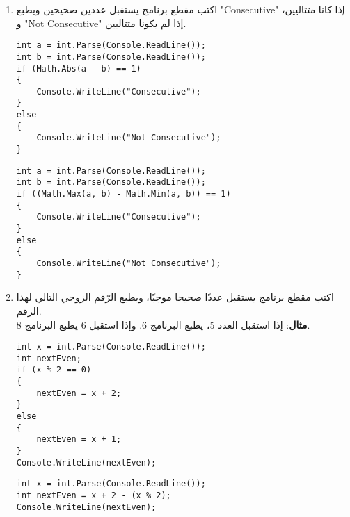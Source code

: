 \documentclass[14pt]{extarticle}
\begin{document}
\begin{enumerate}[itemsep=3em]

\item
اكتب مقطع برنامج يستقبل عددين صحيحين ويطبع \textenglish{"Consecutive"} إذا كانا متتاليين، و \textenglish{"Not Consecutive"} إذا لم يكونا متتاليين.

\ifwithsols
\begin{boxSolution}[1]
\begin{english}
\begin{verbatim}
int a = int.Parse(Console.ReadLine());
int b = int.Parse(Console.ReadLine());
if (Math.Abs(a - b) == 1)
{
    Console.WriteLine("Consecutive");
}
else
{
    Console.WriteLine("Not Consecutive");
}
\end{verbatim}
\end{english}
\end{boxSolution}
\begin{boxSolution}[2]
\begin{english}
\begin{verbatim}
int a = int.Parse(Console.ReadLine());
int b = int.Parse(Console.ReadLine());
if ((Math.Max(a, b) - Math.Min(a, b)) == 1)
{
    Console.WriteLine("Consecutive");
}
else
{
    Console.WriteLine("Not Consecutive");
}
\end{verbatim}
\end{english}
\end{boxSolution}
\clearpage
\fi

\item
اكتب مقطع برنامج يستقبل عددًا صحيحا موجبًا، ويطبع الرّقم الزوجي التالي لهذا الرقم.\\
\textbf{مثال}: إذا استقبل العدد 5، يطبع البرنامج 6. وإذا استقبل 6 يطبع البرنامج 8.

\ifwithsols
\begin{boxSolution}[1]
\begin{english}
\begin{verbatim}
int x = int.Parse(Console.ReadLine());
int nextEven;
if (x % 2 == 0)
{
    nextEven = x + 2;
}
else
{
    nextEven = x + 1;
}
Console.WriteLine(nextEven);
\end{verbatim}
\end{english}
\end{boxSolution}
\begin{boxSolution}[2]
\begin{english}
\begin{verbatim}
int x = int.Parse(Console.ReadLine());
int nextEven = x + 2 - (x % 2);
Console.WriteLine(nextEven);
\end{verbatim}
\end{english}
\end{boxSolution}
\clearpage
\fi


\end{enumerate}
\end{document}
